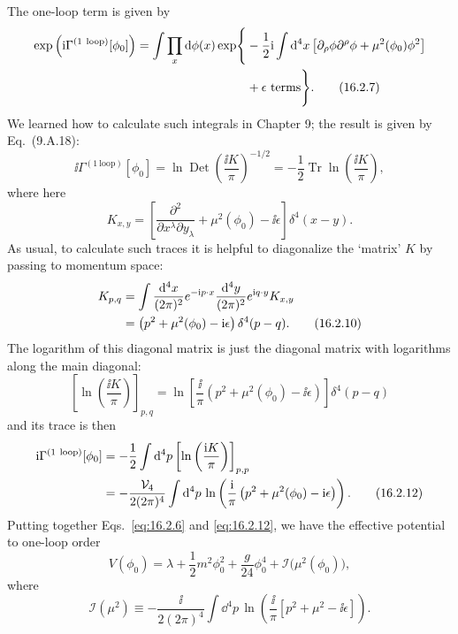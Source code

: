 The one-loop term is given by
\begin{align}
 \exp\left(\mathrm{i}\Gamma^{(1\ \mathrm{loop})}[\phi_0]\right)
 = \int\prod_x \mathop{}\!\mathrm{d}\phi(x)\exp\Biggl\{&-\frac{1}{2}\mathrm{i}\int \mathop{}\!\mathrm{d}^4x
 \left[\partial_\rho\phi\partial^\rho\phi+\mu^2(\phi_0)\phi^2\right]
 \notag\\
 &{}+\epsilon\ \text{terms}\Biggr\} .
 \tag{16.2.7}
 \label{eq:16.2.7}
\end{align}
We learned how to calculate such integrals in Chapter 9; the result is
given by Eq.~(9.A.18):
\begin{equation}
 \ii\Gamma^{(1\ \mathrm{loop})}[\phi_0]
 = \ln\operatorname{Det}\left(\frac{\ii K}{\pi}\right)^{-1/2}
 = -\frac{1}{2}\operatorname{Tr}\ln\left(\frac{\ii K}{\pi}\right) ,
 \tag{16.2.8}
 \label{eq:16.2.8}
\end{equation}
where here
\begin{equation}
 K_{x,y} = \left[\frac{\partial^2}{\partial x^\lambda\partial y_\lambda}
 +\mu^2(\phi_0)-\ii\epsilon\right]\delta^4(x-y) .
 \tag{16.2.9}
 \label{eq:16.2.9}
\end{equation}
As usual, to calculate such traces it is helpful to diagonalize the `matrix'
$K$ by passing to momentum space:
\begin{align}
 K_{p,q} &= \int\frac{\mathop{}\!\mathrm{d}^4x}{(2\pi)^2}e^{-\mathrm{i} p\cdot x}
 \frac{\mathop{}\!\mathrm{d}^4y}{(2\pi)^2}e^{\mathrm{i} q\cdot y}K_{x,y} \notag\\
 &= \left(p^2+\mu^2(\phi_0)-\mathrm{i}\epsilon\right)\delta^4(p-q) .
 \tag{16.2.10}
 \label{eq:16.2.10}
\end{align}
The logarithm of this diagonal matrix is just the diagonal matrix with
logarithms along the main diagonal:
\begin{equation}
 \left[\ln\left(\frac{\ii K}{\pi}\right)\right]_{p,q}
 = \ln\left[\frac{\ii}{\pi}\left(p^2+\mu^2(\phi_0)-\ii\epsilon\right)\right]\delta^4(p-q)
 \tag{16.2.11}
 \label{eq:16.2.11}
\end{equation}
and its trace is then
\begin{align}
 \mathrm{i}\Gamma^{(1\ \mathrm{loop})}[\phi_0]
 &= -\frac{1}{2}\int \mathop{}\!\mathrm{d}^4p\left[\ln\left(\frac{\mathrm{i} K}{\pi}\right)\right]_{p,p} \notag\\
 &= -\frac{\mathcal{V}_4}{2(2\pi)^4}\int \mathop{}\!\mathrm{d}^4p\,
 \ln\left(\frac{\mathrm{i}}{\pi}\left(p^2+\mu^2(\phi_0)-\mathrm{i}\epsilon\right)\right) .
 \tag{16.2.12}
 \label{eq:16.2.12}
\end{align}
Putting together Eqs.~\eqref{eq:16.2.6} and \eqref{eq:16.2.12}, we have the effective potential
to one-loop order
\begin{equation}
 V(\phi_0) = \lambda+\frac{1}{2}m^2\phi_0^2+\frac{g}{24}\phi_0^4
 +\mathcal{I}\bigl(\mu^2(\phi_0)\bigr) ,
 \tag{16.2.13}
 \label{eq:16.2.13}
\end{equation}
where
\begin{equation}
 \mathcal{I}(\mu^2) \equiv -\frac{\ii}{2(2\pi)^4}\int \dd^4p\,
 \ln\left(\frac{\ii}{\pi}\left[p^2+\mu^2-\ii\epsilon\right]\right) .
 \tag{16.2.14}
 \label{eq:16.2.14}
\end{equation}

